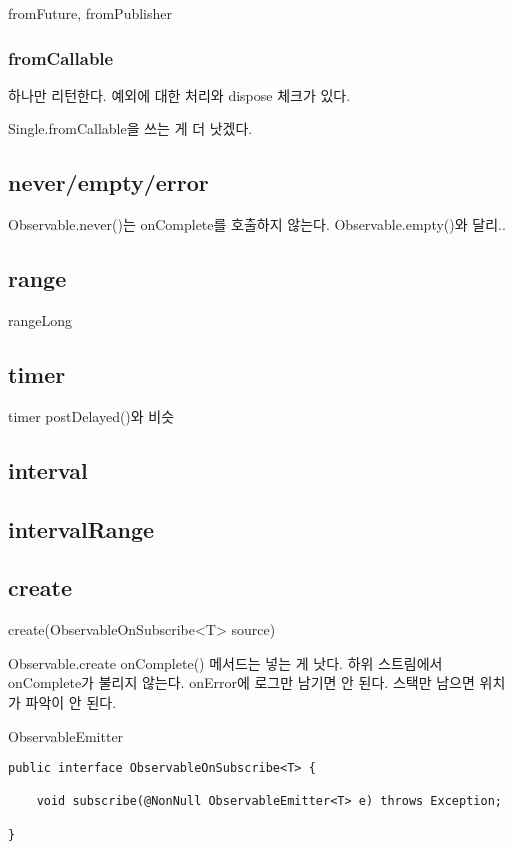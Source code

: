 \documentclass{book}
\begin{document}
fromFuture, fromPublisher

\subsubsection{fromCallable}
하나만 리턴한다. 예외에 대한 처리와 dispose 체크가 있다.

Single.fromCallable을 쓰는 게 더 낫겠다.

\subsection{never/empty/error}
Observable.never()는 onComplete를 호출하지 않는다. Observable.empty()와 달리..

\subsection{range}
rangeLong

\subsection{timer}
timer postDelayed()와 비슷

\subsection{interval}

\subsection{intervalRange}



\subsection{create}
create(ObservableOnSubscribe<T> source)

Observable.create
onComplete() 메서드는 넣는 게 낫다. 
하위 스트림에서 onComplete가 불리지 않는다.
onError에 로그만 남기면 안 된다. 스택만 남으면 위치가 파악이 안 된다. 

ObservableEmitter

\begin{verbatim}
public interface ObservableOnSubscribe<T> {

    void subscribe(@NonNull ObservableEmitter<T> e) throws Exception;
    
}
\end{verbatim}
\end{document}
